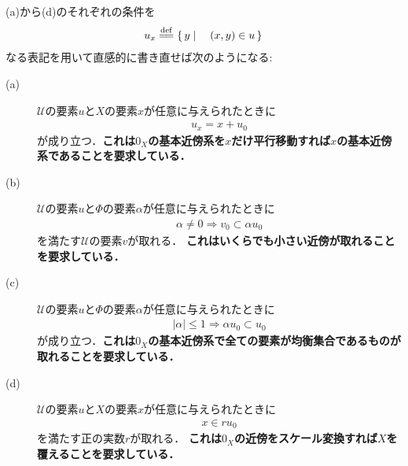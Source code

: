 	(a)から(d)のそれぞれの条件を
	\begin{align}
		u_x \defeq \Set{y}{(x,y) \in u}
	\end{align}
	なる表記を用いて直感的に書き直せば次のようになる:
	\begin{description}
		\item[(a)] $\mathscr{U}$の要素$u$と$X$の要素$x$が任意に与えられたときに
			\begin{align}
				u_x = x + u_{0}
			\end{align}
			が成り立つ．{\bf これは$0_X$の基本近傍系を$x$だけ平行移動すれば$x$の基本近傍系であることを要求している．}
			
		\item[(b)] $\mathscr{U}$の要素$u$と$\Phi$の要素$\alpha$が任意に与えられたときに
			\begin{align}
				\alpha \neq 0 \Longrightarrow v_0 \subset \alpha u_{0}
			\end{align}
			を満たす$\mathscr{U}$の要素$v$が取れる．
			{\bf これはいくらでも小さい近傍が取れることを要求している．}
						
		\item[(c)] $\mathscr{U}$の要素$u$と$\Phi$の要素$\alpha$が任意に与えられたときに
			\begin{align}
				|\alpha| \leq 1 \Longrightarrow \alpha u_{0} \subset u_{0}
			\end{align}
			が成り立つ．{\bf これは$0_X$の基本近傍系で全ての要素が均衡集合であるものが取れることを要求している．}
			
		\item[(d)] $\mathscr{U}$の要素$u$と$X$の要素$x$が任意に与えられたときに
			\begin{align}
				x \in r u_{0}
			\end{align}
			を満たす正の実数$r$が取れる．
			{\bf これは$0_X$の近傍をスケール変換すれば$X$を覆えることを要求している．}
	\end{description}
	
